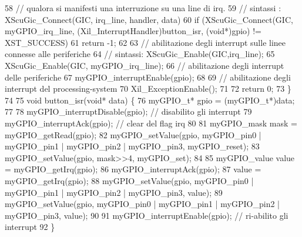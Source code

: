 \begin{DoxyCode}
58     // qualora si manifesti una interruzione su una line di irq.
59     // sintassi : XScuGic\_Connect(GIC, irq\_line, handler, data)
60     if (XScuGic\_Connect(GIC, myGPIO\_irq\_line, (Xil\_InterruptHandler)button\_isr, (void*)gpio) !=
       XST\_SUCCESS)
61         return -1;
62 
63     // abilitazione degli interrupt sulle linee connesse alle periferiche
64     // sintassi: XScuGic\_Enable(GIC,irq\_line);
65     XScuGic\_Enable(GIC, myGPIO\_irq\_line);
66     // abilitazione degli interrupt delle periferiche
67     myGPIO\_interruptEnable(gpio);
68 
69     // abilitazione degli interrupt del processing-system
70     Xil\_ExceptionEnable();
71 
72     return 0;
73 \}
74 
75 void button\_isr(void* data) \{
76     myGPIO\_t* gpio = (myGPIO\_t*)data;
77 
78     myGPIO\_interruptDisable(gpio);  // disabilito gli interrupt
79     myGPIO\_interruptAck(gpio);      // clear del flag irq
80 
81     myGPIO\_mask mask = myGPIO\_getRead(gpio);
82     myGPIO\_setValue(gpio, myGPIO\_pin0 | myGPIO\_pin1 | myGPIO\_pin2 | myGPIO\_pin3, myGPIO\_reset);
83     myGPIO\_setValue(gpio, mask>>4, myGPIO\_set);
84 
85     myGPIO\_value value = myGPIO\_getIrq(gpio);
86     myGPIO\_interruptAck(gpio);
87     value = myGPIO\_getIrq(gpio);
88     myGPIO\_setValue(gpio, myGPIO\_pin0 | myGPIO\_pin1 | myGPIO\_pin2 | myGPIO\_pin3, value);
89     myGPIO\_setValue(gpio, myGPIO\_pin0 | myGPIO\_pin1 | myGPIO\_pin2 | myGPIO\_pin3, value);
90 
91     myGPIO\_interruptEnable(gpio);   // ri-abilito gli interrupt
92 \}
\end{DoxyCode}
 
